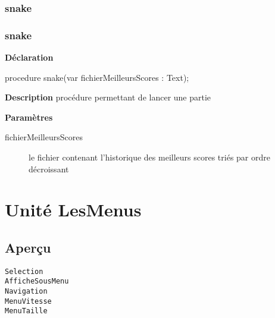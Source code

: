 \documentclass{report}
\newif\ifpdf
\begin{document}
\subsection*{\large{\textbf{snake}}\normalsize\hspace{1ex}\hrulefill}
\else
\subsection*{snake}
\fi
\label{Jouer-snake}
\begin{list}{}{
\setlength{\itemindent}{0cm}
\setlength{\listparindent}{0cm}
\setlength{\leftmargin}{\evensidemargin}
\addtolength{\leftmargin}{\tmplength}
\settowidth{\labelsep}{X}
\addtolength{\leftmargin}{\labelsep}
\setlength{\labelwidth}{\tmplength}
}
\item[\textbf{Déclaration}\hfill]
\ifpdf
\begin{flushleft}
\fi
\begin{ttfamily}
procedure snake(var fichierMeilleursScores : Text);\end{ttfamily}

\ifpdf
\end{flushleft}
\fi

\par
\item[\textbf{Description}]
procédure permettant de lancer une partie \par
\item[\textbf{Paramètres}]
\begin{description}
\item[fichierMeilleursScores] le fichier contenant l'historique des meilleurs scores triés par ordre décroissant
\end{description}


\end{list}
\chapter{Unité LesMenus}
\label{LesMenus}
\section{Aperçu}
\begin{description}
\item[\texttt{\begin{ttfamily}TMainMenu\end{ttfamily} Objet}]
\end{description}
\begin{description}
\item[\texttt{Selection}]
\item[\texttt{AfficheSousMenu}]
\item[\texttt{Navigation}]
\item[\texttt{MenuVitesse}]
\item[\texttt{MenuTaille}]
\end{description}
\end{document}
